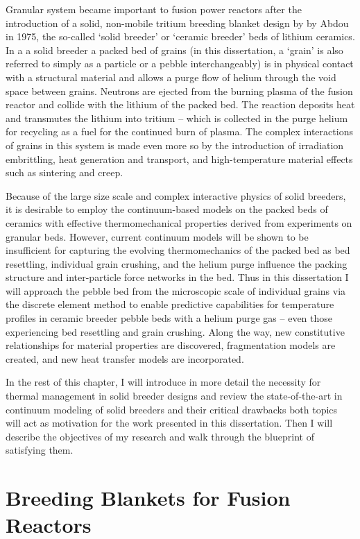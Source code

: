 Granular system became important to fusion power reactors after the introduction of a solid, non-mobile tritium breeding blanket design by by Abdou\etal\cite{Abdou1975} in 1975, the so-called `solid breeder' or `ceramic breeder' beds of lithium ceramics. In a a solid breeder a packed bed of grains (in this dissertation, a `grain' is also referred to simply as a particle or a pebble interchangeably) is in physical contact with a structural material and allows a purge flow of helium through the void space between grains. Neutrons are ejected from the burning plasma of the fusion reactor and collide with the lithium of the packed bed. The reaction deposits heat and transmutes the lithium into tritium -- which is collected in the purge helium for recycling as a fuel for the continued burn of plasma. The complex interactions of grains in this system is made even more so by the introduction of irradiation embrittling, heat generation and transport, and high-temperature material effects such as sintering and creep.

Because of the large size scale and complex interactive physics of solid breeders, it is desirable to employ the continuum-based models on the packed beds of ceramics with effective thermomechanical properties derived from experiments on granular beds. However, current continuum models will be shown to be insufficient for capturing the evolving thermomechanics of the packed bed as bed resettling, individual grain crushing, and the helium purge influence the packing structure and inter-particle force networks in the bed. Thus in this dissertation I will approach the pebble bed from the microscopic scale of individual grains via the discrete element method to enable predictive capabilities for temperature profiles in ceramic breeder pebble beds with a helium purge gas -- even those experiencing bed resettling and grain crushing. Along the way, new constitutive relationships for material properties are discovered, fragmentation models are created, and new heat transfer models are incorporated.

In the rest of this chapter, I will introduce in more detail the necessity for thermal management in solid breeder designs and review the state-of-the-art in continuum modeling of solid breeders and their critical drawbacks both topics will act as motivation for the work presented in this dissertation. Then I will describe the objectives of my research and walk through the blueprint of satisfying them.


\section{Breeding Blankets for Fusion Reactors}


